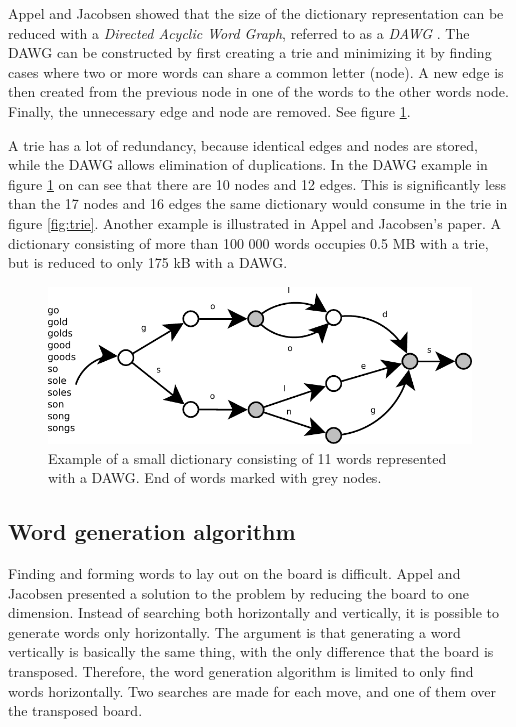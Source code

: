 \documentclass[a4paper, 12pt]{report}
\begin{document}
Appel and Jacobsen showed that the size of the dictionary representation can be reduced with a \emph{Directed Acyclic Word Graph}, referred to as a \emph{DAWG} \cite{fastest}. The DAWG can be constructed by first creating a trie and minimizing it by finding cases where two or more words can share a common letter (node). A new edge is then created from the previous node in one of the words to the other words node. Finally, the unnecessary edge and node are removed. See figure \ref{fig:dawg}.

A trie has a lot of redundancy, because identical edges and nodes are stored, while the DAWG allows elimination of duplications. In the DAWG example in figure \ref{fig:dawg} on can see that there are 10 nodes and 12 edges. This is significantly less than the 17 nodes and 16 edges the same dictionary would consume in the trie in figure \ref{fig:trie}. Another example is illustrated in Appel and Jacobsen's paper\cite{fastest}. A dictionary consisting of more than 100 000 words occupies 0.5 MB with a trie, but is reduced to only 175 kB with a DAWG.

\begin{figure}[h]
\centering
\includegraphics[scale=1]{dawg}
\caption{Example of a small dictionary consisting of 11 words represented with a DAWG. End of words marked with grey nodes.}
\label{fig:dawg}
\end{figure}

\subsection{Word generation algorithm}
Finding and forming words to lay out on the board is difficult. Appel and Jacobsen presented a solution to the problem by reducing the board to one dimension. Instead of searching both horizontally and vertically, it is possible to generate words only horizontally. The argument is that generating a word vertically is basically the same thing, with the only difference that the board is transposed. Therefore, the word generation algorithm is limited to only find words horizontally. Two searches are made for each move, and one of them over the transposed board. \cite{fastest}
\end{document}
